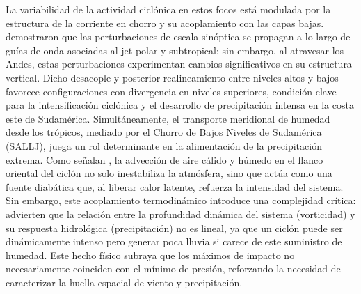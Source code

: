 

La variabilidad de la actividad ciclónica en estos focos está modulada por la estructura de la corriente en chorro y su acoplamiento con las capas bajas. \citet{vera2002cold} demostraron que las perturbaciones de escala sinóptica se propagan a lo largo de guías de onda asociadas al jet polar y subtropical; sin embargo, al atravesar los Andes, estas perturbaciones experimentan cambios significativos en su estructura vertical. Dicho desacople y posterior realineamiento entre niveles altos y bajos favorece configuraciones con divergencia en niveles superiores, condición clave para la intensificación ciclónica y el desarrollo de precipitación intensa en la costa este de Sudamérica.
Simultáneamente, el transporte meridional de humedad desde los trópicos, mediado por el Chorro de Bajos Niveles de Sudamérica (SALLJ), juega un rol determinante en la alimentación de la precipitación extrema. Como señalan \citet{reboita2022from}, la advección de aire cálido y húmedo en el flanco oriental del ciclón no solo inestabiliza la atmósfera, sino que actúa como una fuente diabática que, al liberar calor latente, refuerza la intensidad del sistema.
Sin embargo, este acoplamiento termodinámico introduce una complejidad crítica: \citet{sinclair2023relationship} advierten que la relación entre la profundidad dinámica del sistema (vorticidad) y su respuesta hidrológica (precipitación) no es lineal, ya que un ciclón puede ser dinámicamente intenso pero generar poca lluvia si carece de este suministro de humedad. Este hecho físico subraya que los máximos de impacto no necesariamente coinciden con el mínimo de presión, reforzando la necesidad de caracterizar la huella espacial de viento y precipitación.

